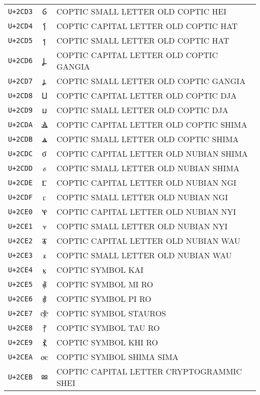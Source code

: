 \documentclass[10pt,a4paper]{article}
\newcommand{\coptic}[1]{{\copticfont #1}}
\begin{document}
\begin{longtable}{C C L}
\texttt{U+2CD3} & \coptic{ⳓ} & COPTIC SMALL LETTER OLD COPTIC HEI \\
\texttt{U+2CD4} & \coptic{Ⳕ} & COPTIC CAPITAL LETTER OLD COPTIC HAT \\
\texttt{U+2CD5} & \coptic{ⳕ} & COPTIC SMALL LETTER OLD COPTIC HAT \\
\texttt{U+2CD6} & \coptic{Ⳗ} & COPTIC CAPITAL LETTER OLD COPTIC GANGIA \\
\texttt{U+2CD7} & \coptic{ⳗ} & COPTIC SMALL LETTER OLD COPTIC GANGIA \\
\texttt{U+2CD8} & \coptic{Ⳙ} & COPTIC CAPITAL LETTER OLD COPTIC DJA \\
\texttt{U+2CD9} & \coptic{ⳙ} & COPTIC SMALL LETTER OLD COPTIC DJA \\
\texttt{U+2CDA} & \coptic{Ⳛ} & COPTIC CAPITAL LETTER OLD COPTIC SHIMA \\
\texttt{U+2CDB} & \coptic{ⳛ} & COPTIC SMALL LETTER OLD COPTIC SHIMA \\
\texttt{U+2CDC} & \coptic{Ⳝ} & COPTIC CAPITAL LETTER OLD NUBIAN SHIMA \\
\texttt{U+2CDD} & \coptic{ⳝ} & COPTIC SMALL LETTER OLD NUBIAN SHIMA \\
\texttt{U+2CDE} & \coptic{Ⳟ} & COPTIC CAPITAL LETTER OLD NUBIAN NGI \\
\texttt{U+2CDF} & \coptic{ⳟ} & COPTIC SMALL LETTER OLD NUBIAN NGI \\
\texttt{U+2CE0} & \coptic{Ⳡ} & COPTIC CAPITAL LETTER OLD NUBIAN NYI \\
\texttt{U+2CE1} & \coptic{ⳡ} & COPTIC SMALL LETTER OLD NUBIAN NYI \\
\texttt{U+2CE2} & \coptic{Ⳣ} & COPTIC CAPITAL LETTER OLD NUBIAN WAU \\
\texttt{U+2CE3} & \coptic{ⳣ} & COPTIC SMALL LETTER OLD NUBIAN WAU \\
\texttt{U+2CE4} & \coptic{ⳤ} & COPTIC SYMBOL KAI \\
\texttt{U+2CE5} & \coptic{⳥} & COPTIC SYMBOL MI RO \\
\texttt{U+2CE6} & \coptic{⳦} & COPTIC SYMBOL PI RO \\
\texttt{U+2CE7} & \coptic{⳧} & COPTIC SYMBOL STAUROS \\
\texttt{U+2CE8} & \coptic{⳨} & COPTIC SYMBOL TAU RO \\
\texttt{U+2CE9} & \coptic{⳩} & COPTIC SYMBOL KHI RO \\
\texttt{U+2CEA} & \coptic{⳪} & COPTIC SYMBOL SHIMA SIMA \\
\texttt{U+2CEB} & \coptic{Ⳬ} & COPTIC CAPITAL LETTER CRYPTOGRAMMIC SHEI \\

\end{longtable}
\end{document}
